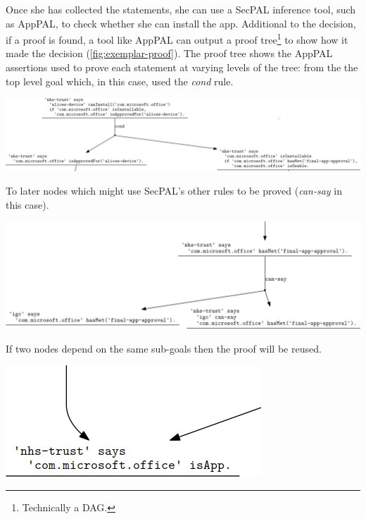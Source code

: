 \documentclass[thesis.tex]{subfiles}
\begin{document}
Once she has collected the statements, she can use a SecPAL inference tool,
such as AppPAL, to check whether she can install the app.  Additional to the
decision, if a proof is found, a tool like AppPAL can output a proof
tree\footnote{Technically a DAG.} to show how it made the decision
(\autoref{fig:exemplar-proof}).  The proof tree shows the AppPAL assertions
used to prove each statement at varying levels of the tree: from the the top
level goal which, in this case, used the \emph{cond} rule.

\begin{center}
  \includegraphics[width=0.9\linewidth]{figures/exemplar-proof-1.png}
\end{center}

To later nodes which might use SecPAL's other rules to be proved (\emph{can-say} in this case).

\begin{center}
  \includegraphics[width=0.9\linewidth]{figures/exemplar-proof-2.png}
\end{center}

If two nodes depend on the same sub-goals then the proof will be reused.

\begin{center}
  \includegraphics[width=0.9\linewidth]{figures/exemplar-proof-3.png}
\end{center}
\end{document}
